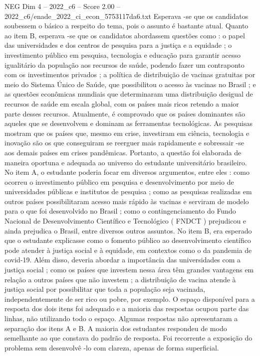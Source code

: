 \begin{textsample}{NEG Dim 4 – 2022\_c6 – Score 2.00 – 2022\_c6/enade\_2022\_ci\_econ\_5753117da6.txt}
Esperava -se que os candidatos soubessem o básico a respeito do tema, pois o assunto é bastante atual.
Quanto ao item B, esperava -se que os candidatos abordassem questões como : o papel das universidades e dos centros de pesquisa para a justiça e a equidade ; o investimento público em pesquisa, tecnologia e educação para garantir acesso igualitário da população aos recursos de saúde, podendo fazer um contraponto com os investimentos privados ; a política de distribuição de vacinas gratuitas por meio do Sistema Único de Saúde, que possibilitou o acesso às vacinas no Brasil ; e as questões econômicas mundiais que determinaram uma distribuição desigual de recursos de saúde em escala global, com os países mais ricos retendo a maior parte desses recursos.
Atualmente, é comprovado que os países dominantes são aqueles que se desenvolvem e dominam as ferramentas tecnológicas.
As pesquisas mostram que os países que, mesmo em crise, investiram em ciência, tecnologia e inovação são os que conseguiram se reerguer mais rapidamente e sobressair -se aos demais países em crises pandêmicas.
Portanto, a questão foi elaborada de maneira oportuna e adequada ao universo do estudante universitário brasileiro.
No item A, o estudante poderia focar em diversos argumentos, entre eles : como ocorreu o investimento público em pesquisa e desenvolvimento por meio de universidades públicas e institutos de pesquisa ; como as pesquisas realizadas em outros países possibilitaram acesso mais rápido às vacinas e serviram de modelo para o que foi desenvolvido no Brasil ; como o contingenciamento do Fundo Nacional de Desenvolvimento Científico e Tecnológico ( FNDCT ) prejudicou e ainda prejudica o Brasil, entre diversos outros assuntos.
No item B, era esperado que o estudante explicasse como o fomento público ao desenvolvimento científico pode atender à justiça social e à equidade, em contextos como o da pandemia de covid-19.
Além disso, deveria abordar a importância das universidades com a justiça social ; como os países que investem nessa área têm grandes vantagens em relação a outros países que não investem ; a distribuição de vacina atende à justiça social por possibilitar que toda a população seja vacinada, independentemente de ser rico ou pobre, por exemplo.
O espaço disponível para a resposta dos dois itens foi adequado e a maioria das respostas ocupou parte das linhas, não utilizando todo o espaço.
Algumas respostas não apresentaram a separação dos itens A e B.
A maioria dos estudantes respondeu de modo semelhante ao que constava do padrão de resposta.
Foi recorrente a exposição do problema sem desenvolvê -lo com clareza, apenas de forma superficial.

\end{textsample}
